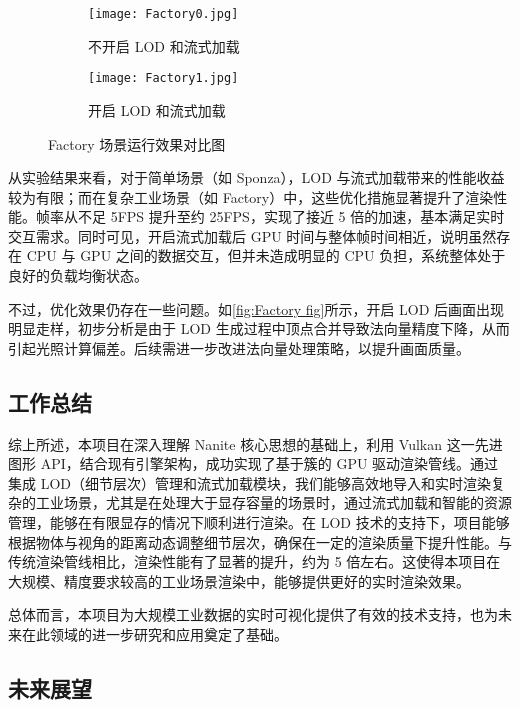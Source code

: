 \begin{figure*}[h]
    \centering
    \begin{subfigure}[b]{0.48\linewidth}
        \centering
        \texttt{[image: Factory0.jpg]}
        \caption{不开启 LOD 和流式加载}
    \end{subfigure}%
    \hfill %
    \begin{subfigure}[b]{0.48\linewidth}
        \centering
        \texttt{[image: Factory1.jpg]}
        \caption{开启 LOD 和流式加载}
    \end{subfigure}%
    \caption{Factory 场景运行效果对比图}
    \vspace{-0.2cm}
    \label{fig:Factory fig}
\end{figure*}

从实验结果来看，对于简单场景（如 Sponza），LOD 与流式加载带来的性能收益较为有限；而在复杂工业场景（如 Factory）中，这些优化措施显著提升了渲染性能。帧率从不足 5FPS 提升至约 25FPS，实现了接近 5 倍的加速，基本满足实时交互需求。同时可见，开启流式加载后 GPU 时间与整体帧时间相近，说明虽然存在 CPU 与 GPU 之间的数据交互，但并未造成明显的 CPU 负担，系统整体处于良好的负载均衡状态。

不过，优化效果仍存在一些问题。如\autoref{fig:Factory fig}所示，开启 LOD 后画面出现明显走样，初步分析是由于 LOD 生成过程中顶点合并导致法向量精度下降，从而引起光照计算偏差。后续需进一步改进法向量处理策略，以提升画面质量。

\subsection{工作总结}

综上所述，本项目在深入理解 Nanite 核心思想的基础上，利用 Vulkan 这一先进图形 API，结合现有引擎架构，成功实现了基于簇的 GPU 驱动渲染管线。通过集成 LOD（细节层次）管理和流式加载模块，我们能够高效地导入和实时渲染复杂的工业场景，尤其是在处理大于显存容量的场景时，通过流式加载和智能的资源管理，能够在有限显存的情况下顺利进行渲染。在 LOD 技术的支持下，项目能够根据物体与视角的距离动态调整细节层次，确保在一定的渲染质量下提升性能。与传统渲染管线相比，渲染性能有了显著的提升，约为 5 倍左右。这使得本项目在大规模、精度要求较高的工业场景渲染中，能够提供更好的实时渲染效果。

总体而言，本项目为大规模工业数据的实时可视化提供了有效的技术支持，也为未来在此领域的进一步研究和应用奠定了基础。

\subsection{未来展望}

